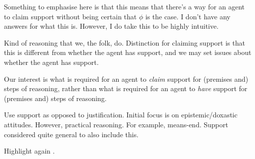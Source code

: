\begin{note}
  \color{red}
  Something to emphasise here is that this means that there's a way for an agent to claim support without being certain that \(\phi\) is the case.
  I don't have any answers for what this is.
  However, I do take this to be highly intuitive.
\end{note}


\begin{note}[Adequate]
  Kind of reasoning that we, the folk, do.
  Distinction for claiming support is that this is different from whether the agent has support, and we may set issues about whether the agent has support.

  Our interest is what is required for an agent to \emph{claim} support for (premises and) steps of reasoning, rather than what is required for an agent to \emph{have} support for (premises and) steps of reasoning.

  Use support as opposed to justification.
  Initial focus is on epistemic/doxastic attitudes.
  However, practical reasoning.
  For example, means-end.
  Support considered quite general to also include this.
\end{note}

\begin{note}
  Highlight again .
\end{note}

